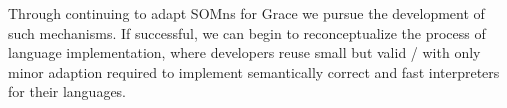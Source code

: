 Through continuing to adapt SOMns for Grace we pursue the development of such mechanisms. If successful, we can begin to reconceptualize the process of language implementation, where developers reuse small but valid \VMs/ with only minor adaption required to implement semantically correct and fast interpreters for their languages.

%

